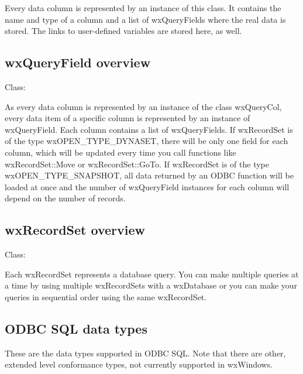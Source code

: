 Every data column is represented by an instance of this class.
It contains the name and type of a column and a list of wxQueryFields where
the real data is stored. The links to user-defined variables are stored
here, as well.

\subsection{wxQueryField overview}\label{wxqueryfieldoverview}


Class: 

As every data column is represented by an instance of the class wxQueryCol,
every data item of a specific column is represented by an instance of
wxQueryField. Each column contains a list of wxQueryFields. If wxRecordSet is
of the type wxOPEN\_TYPE\_DYNASET, there will be only one field for each column,
which will be updated every time you call functions like wxRecordSet::Move
or wxRecordSet::GoTo. If wxRecordSet is of the type wxOPEN\_TYPE\_SNAPSHOT,
all data returned by an ODBC function will be loaded at once and the number
of wxQueryField instances for each column will depend on the number of records.

\subsection{wxRecordSet overview}\label{wxrecordsetoverview}


Class: 

Each wxRecordSet represents a database query. You can make multiple queries
at a time by using multiple wxRecordSets with a wxDatabase or you can make
your queries in sequential order using the same wxRecordSet.

\subsection{ODBC SQL data types}\label{sqltypes}


These are the data types supported in ODBC SQL. Note that there are other, extended level conformance
types, not currently supported in wxWindows.

\begin{twocollist}\itemsep=0pt
\end{twocollist}

